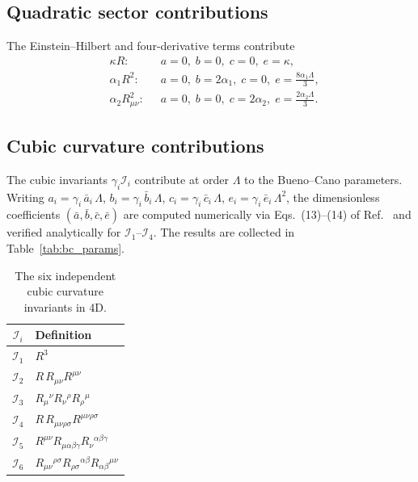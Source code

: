 \documentclass[aps,prd,twocolumn,superscriptaddress,nofootinbib]{revtex4-2}
\begin{document}
\subsection{Quadratic sector contributions}

The Einstein--Hilbert and four-derivative terms contribute
\begin{equation}
\begin{aligned}
&\text{$\kappa R$:}   &&a{=}0,\; b{=}0,\; c{=}0,\; e{=}\kappa,\\
&\text{$\alpha_1 R^2$:} &&a{=}0,\; b{=}2\alpha_1,\; c{=}0,\;
  e{=}\tfrac{8\alpha_1\Lambda}{3},\\
&\text{$\alpha_2 R_{\mu\nu}^2$:} &&a{=}0,\; b{=}0,\; c{=}2\alpha_2,\;
  e{=}\tfrac{2\alpha_2\Lambda}{3}.
\end{aligned}
\end{equation}

\subsection{Cubic curvature contributions}
\label{sec:cubics}

The cubic invariants $\gamma_i\mathcal{I}_i$ contribute at order
$\Lambda$ to the Bueno--Cano parameters.  Writing
$a_i = \gamma_i\,\bar a_i\,\Lambda$,
$b_i = \gamma_i\,\bar b_i\,\Lambda$,
$c_i = \gamma_i\,\bar c_i\,\Lambda$,
$e_i = \gamma_i\,\bar e_i\,\Lambda^2$,
the dimensionless coefficients $(\bar a, \bar b, \bar c, \bar e)$
are computed numerically via Eqs.~(13)--(14)
of Ref.~\cite{BuenoCano2016} and verified analytically for
$\mathcal{I}_1$--$\mathcal{I}_4$.  The results are collected in
Table~\ref{tab:bc_params}.

\begin{table}[t]
\caption{\label{tab:cubics}%
The six independent cubic curvature invariants in 4D.}
\begin{ruledtabular}
\begin{tabular}{cl}
$\mathcal{I}_i$ & Definition \\
\midrule
$\mathcal{I}_1$ & $R^3$ \\
$\mathcal{I}_2$ & $R\,R_{\mu\nu}R^{\mu\nu}$ \\
$\mathcal{I}_3$ & $R_\mu{}^\nu R_\nu{}^\rho R_\rho{}^\mu$ \\
$\mathcal{I}_4$ & $R\,R_{\mu\nu\rho\sigma}R^{\mu\nu\rho\sigma}$ \\
$\mathcal{I}_5$ & $R^{\mu\nu}R_{\mu\alpha\beta\gamma}R_\nu{}^{\alpha\beta\gamma}$ \\
$\mathcal{I}_6$ & $R_{\mu\nu}{}^{\rho\sigma}R_{\rho\sigma}{}^{\alpha\beta}R_{\alpha\beta}{}^{\mu\nu}$ \\
\end{tabular}
\end{ruledtabular}
\end{table}
\end{document}
